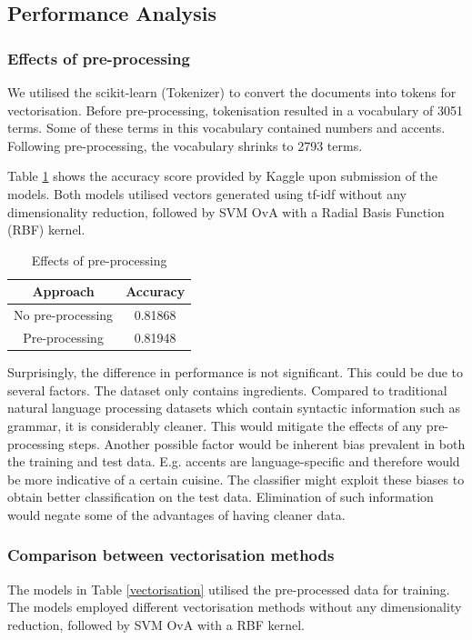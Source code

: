 \documentclass{article}
\def\light#1{{\color{light}#1}}
\begin{document}
\subsection{Performance Analysis}
\subsubsection*{Effects of pre-processing}
We utilised the \light{scikit-learn (Tokenizer)} to convert the documents into tokens for vectorisation. Before pre-processing, tokenisation resulted in a vocabulary of 3051 terms. Some of these terms in this vocabulary contained numbers and accents. Following pre-processing, the vocabulary shrinks to 2793 terms. 

Table \ref{preprocessing} shows the accuracy score provided by Kaggle upon submission of the models. Both models utilised vectors generated using tf-idf without any dimensionality reduction, followed by SVM OvA with a Radial Basis Function (RBF) kernel.


\begin{table}[h]
\centering
\begin{tabular}{|c|c|}
\hline
\textbf{Approach}& \multicolumn{1}{l|}{\textbf{Accuracy}} \\ \hline
No pre-processing & 0.81868                       \\
Pre-processing    & 0.81948                       \\
 \hline
\end{tabular}
\caption{Effects of pre-processing}
\label{preprocessing}
\end{table}

Surprisingly, the difference in performance is not significant. This could be due to several factors. The dataset only contains ingredients. Compared to traditional natural language processing datasets which contain syntactic information such as grammar, it is considerably cleaner. This would mitigate the effects of any pre-processing steps. Another possible factor would be inherent bias prevalent in both the training and test data. E.g. accents are language-specific and therefore would be more indicative of a certain cuisine. The classifier might exploit these biases to obtain better classification on the test data. Elimination of such information would negate some of the advantages of having cleaner data.  

\subsubsection*{Comparison between vectorisation methods} 
The models in Table \ref{vectorisation} utilised the pre-processed data for training. The models employed different vectorisation methods without any dimensionality reduction, followed by SVM OvA with a RBF kernel.
\end{document}
